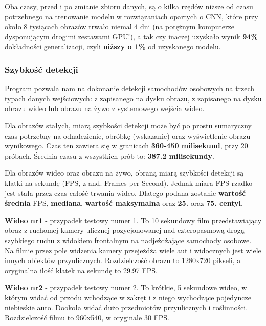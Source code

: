 Oba czasy, przed i po zmianie zbioru danych, są o kilka rzędów niższe od czasu potrzebnego na trenowanie modelu w rozwiązaniach opartych o CNN, które przy około 8 tysiącach obrazów trwało niemal 4 dni (na potężnym komputerze dysponującym drogimi zestawami GPU!), a tak czy inaczej uzyskało wynik \textbf{94\%} dokładności generalizacji, czyli \textbf{niższy o 1\%} od uzyskanego modelu.

\subsubsection{Szybkość detekcji}
Program pozwala nam na dokonanie detekcji samochodów osobowych na trzech typach danych wejściowych: z zapisanego na dysku obrazu, z zapisanego na dysku obrazu wideo lub obrazu na żywo z systemowego wejścia wideo.

Dla obrazów stałych, miarą szybkości detekcji może być po prostu sumaryczny czas potrzebny na odnalezienie, obróbkę (wskazanie) oraz wyświetlenie obrazu wynikowego. Czas ten zawiera się w granicach \textbf{360-450 milisekund}, przy 20 próbach. Średnia czasu z wszystkich prób to: \textbf{387.2 milisekundy}.

Dla obrazów wideo oraz obrazu na żywo, obraną miarą szybkości detekcji są klatki na sekundę (FPS, z and. Frames per Second). Jednak miara FPS rzadko jest stała przez czas całość trwania wideo. Dlatego podana zostanie \textbf{wartość średnia} FPS, \textbf{mediana}, \textbf{wartość maksymalna} oraz \textbf{25.} oraz \textbf{75. centyl}.

\begin{description}
\item \textbf{Wideo nr1} - przypadek testowy numer 1. To 10 sekundowy film przedstawiający obraz z ruchomej kamery ulicznej pozycjonowanej nad czteropasmową drogą szybkiego ruchu z widokiem frontalnym na nadjeżdżające samochody osobowe. Na filmie przez pole widzenia kamery przejeżdża wiele aut i widocznych jest wiele innych obiektów przyulicznych. Rozdzielczość obrazu to 1280x720 pikseli, a oryginalna ilość klatek na sekundę to 29.97 FPS.

\item \textbf{Wideo nr2} - przypadek testowy numer 2. To krótkie, 5 sekundowe wideo, w którym widać od przodu wchodzące w zakręt i z niego wychodzące pojedyncze niebieskie auto. Dookoła widać dużo przedmiotów przyulicznych i roślinności. Rozdzielczość filmu to 960x540, w oryginale 30 FPS. 

\end{description}


